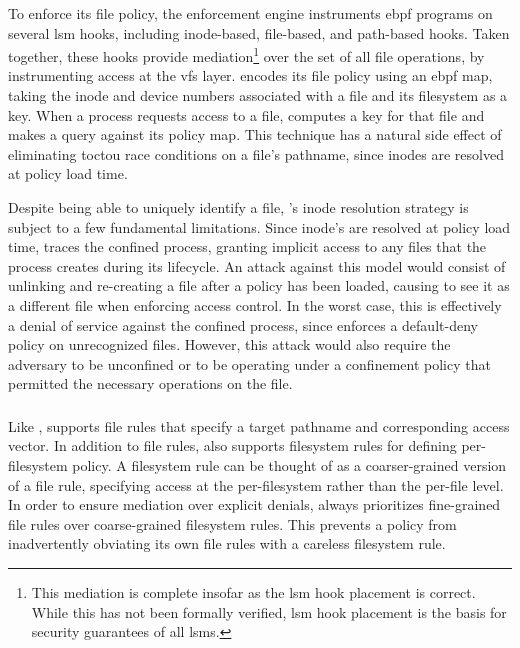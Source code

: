 To enforce its file policy, the \bpfbox{} enforcement engine instruments \gls{ebpf}
programs on several \gls{lsm} hooks, including inode-based, file-based, and path-based
hooks. Taken together, these hooks provide mediation\footnote{This mediation is complete
insofar as the \gls{lsm} hook placement is correct. While this has not been formally
verified, \gls{lsm} hook placement is the basis for security guarantees of all
\glspl{lsm}.} over the set of all file operations, by instrumenting access at the
\gls{vfs} layer. \bpfbox{} encodes its file policy using an \gls{ebpf} map, taking the
inode and device numbers associated with a file and its filesystem as a key. When
a process requests access to a file, \bpfbox{} computes a key for that file and makes
a query against its policy map. This technique has a natural side effect of eliminating
\gls{toctou} race conditions on a file's pathname, since inodes are resolved at policy
load time.

Despite being able to uniquely identify a file, \bpfbox{}'s inode resolution strategy is
subject to a few fundamental limitations. Since inode's are resolved at policy load time,
\bpfbox{} traces the confined process, granting implicit access to any files that the
process creates during its lifecycle.  An attack against this model would consist of
unlinking and re-creating a file after a policy has been loaded, causing \bpfbox{} to see
it as a different file when enforcing access control. In the worst case, this is
effectively a denial of service against the confined process, since \bpfbox{} enforces
a default-deny policy on unrecognized files. However, this attack would also require the
adversary to be unconfined or to be operating under a confinement policy that permitted
the necessary operations on the file.

\subsubsection{\bpfcontain{}}

Like \bpfbox{}, \bpfcontain{} supports file rules that specify a target pathname and
corresponding access vector. In addition to file rules, \bpfcontain{} also supports
filesystem rules for defining per-filesystem policy. A filesystem rule can be thought of
as a coarser-grained version of a file rule, specifying access at the per-filesystem
rather than the per-file level. In order to ensure mediation over explicit denials,
\bpfcontain{} always prioritizes fine-grained file rules over coarse-grained filesystem
rules. This prevents a policy from inadvertently obviating its own file rules with
a careless filesystem rule.

